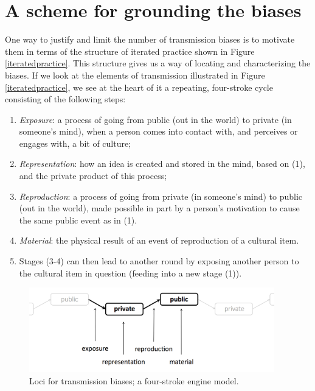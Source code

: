 \section{A scheme for grounding the biases}


One way to justify and limit the number of transmission 
biases is to motivate them in terms of the structure of iterated practice shown in Figure \ref{iteratedpractice}. This structure gives us a way of locating and characterizing the biases. 
If we look at the elements of transmission illustrated in Figure \ref{iteratedpractice}, we see 
at the heart of it a repeating, four-stroke cycle consisting of the following steps: 


\begin{enumerate}
 
\item \textit{Exposure}: a process of going from public (out in the world) to private (in someone's mind), 
when a person comes into contact with, and 
perceives or engages with, a bit of culture;



\item \textit{Representation}: how an idea is created and stored in the mind, based on (1), and the private product of this process;



\item \textit{Reproduction}: a process of going from private (in someone's mind) to public (out in the world), 
made possible in part by a person's motivation to cause the same 
public event as in (1). 



\item \textit{Material}: the physical result of an 
event of reproduction of a cultural item.



\item Stages (3-4) can then lead to another round by exposing another 
person to the cultural item in question (feeding into a new stage (1)). 

\end{enumerate}





\begin{figure}[h]
\includegraphics[width=0.95\textwidth,keepaspectratio]{figures/ch02fig02}
\caption{Loci for transmission biases; a four-stroke engine model.}
\label{fourstroke}
\end{figure}




